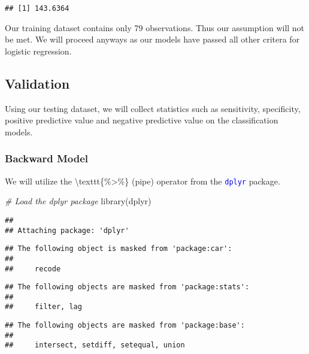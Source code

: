 \documentclass[
]{article}
\newenvironment{Shaded}{\begin{snugshade}}{\end{snugshade}}
\newcommand{\CommentTok}[1]{\textcolor[rgb]{0.56,0.35,0.01}{\textit{#1}}}
\newcommand{\FunctionTok}[1]{\textcolor[rgb]{0.00,0.00,0.00}{#1}}
\newcommand{\NormalTok}[1]{#1}
\begin{document}
\begin{verbatim}
## [1] 143.6364
\end{verbatim}

Our training dataset contains only 79 observations. Thus our assumption
will not be met. We will proceed anyways as our models have passed all
other critera for logistic regression.

\hypertarget{validation}{%
\subsection{Validation}\label{validation}}

Using our testing dataset, we will collect statistics such as
sensitivity, specificity, positive predictive value and negative
predictive value on the classification models.

\hypertarget{backward-model}{%
\subsubsection{Backward Model}\label{backward-model}}

We will utilize the \textbackslash texttt\{\%\textgreater\%\} (pipe)
operator from the \textcolor{blue}{\texttt{dplyr}} package.

\begin{Shaded}
\begin{Highlighting}[]
\CommentTok{\# Load the dplyr package}
\FunctionTok{library}\NormalTok{(dplyr)}
\end{Highlighting}
\end{Shaded}

\begin{verbatim}
## 
## Attaching package: 'dplyr'
\end{verbatim}

\begin{verbatim}
## The following object is masked from 'package:car':
## 
##     recode
\end{verbatim}

\begin{verbatim}
## The following objects are masked from 'package:stats':
## 
##     filter, lag
\end{verbatim}

\begin{verbatim}
## The following objects are masked from 'package:base':
## 
##     intersect, setdiff, setequal, union
\end{verbatim}
\end{document}
